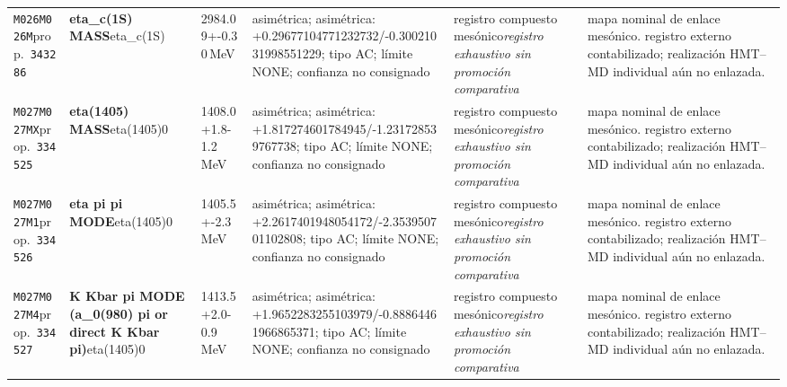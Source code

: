 \begin{landscape}
\begin{longtable}{L{1.85cm}L{4.45cm}L{2.35cm}L{4.05cm}L{3.35cm}L{7.15cm}}
\texttt{M026}\newline \texttt{M026M}\newline prop.\ \texttt{343286} & \textbf{eta\_\allowbreak{}c(1S) MASS}\newline eta\_\allowbreak{}c(1S) & 2984.09+-0.30\,MeV & asimétrica; asimétrica: +0.29677104771232732/-0.30021031998551229; tipo AC; límite NONE; confianza no consignado & registro compuesto mesónico\newline \emph{registro exhaustivo sin promoción comparativa} & mapa nominal de enlace mesónico. registro externo contabilizado; realización HMT--MD individual aún no enlazada. \\
\texttt{M027}\newline \texttt{M027MX}\newline prop.\ \texttt{334525} & \textbf{eta(1405) MASS}\newline eta(1405)0 & 1408.0+1.8-1.2\,MeV & asimétrica; asimétrica: +1.817274601784945/-1.231728539767738; tipo AC; límite NONE; confianza no consignado & registro compuesto mesónico\newline \emph{registro exhaustivo sin promoción comparativa} & mapa nominal de enlace mesónico. registro externo contabilizado; realización HMT--MD individual aún no enlazada. \\
\texttt{M027}\newline \texttt{M027M1}\newline prop.\ \texttt{334526} & \textbf{eta pi pi MODE}\newline eta(1405)0 & 1405.5+-2.3\,MeV & asimétrica; asimétrica: +2.2617401948054172/-2.353950701102808; tipo AC; límite NONE; confianza no consignado & registro compuesto mesónico\newline \emph{registro exhaustivo sin promoción comparativa} & mapa nominal de enlace mesónico. registro externo contabilizado; realización HMT--MD individual aún no enlazada. \\
\texttt{M027}\newline \texttt{M027M4}\newline prop.\ \texttt{334527} & \textbf{K Kbar pi MODE (a\_\allowbreak{}0(980) pi or direct K Kbar pi)}\newline eta(1405)0 & 1413.5+2.0-0.9\,MeV & asimétrica; asimétrica: +1.9652283255103979/-0.88864461966865371; tipo AC; límite NONE; confianza no consignado & registro compuesto mesónico\newline \emph{registro exhaustivo sin promoción comparativa} & mapa nominal de enlace mesónico. registro externo contabilizado; realización HMT--MD individual aún no enlazada. \\

\end{longtable}
\end{landscape}
